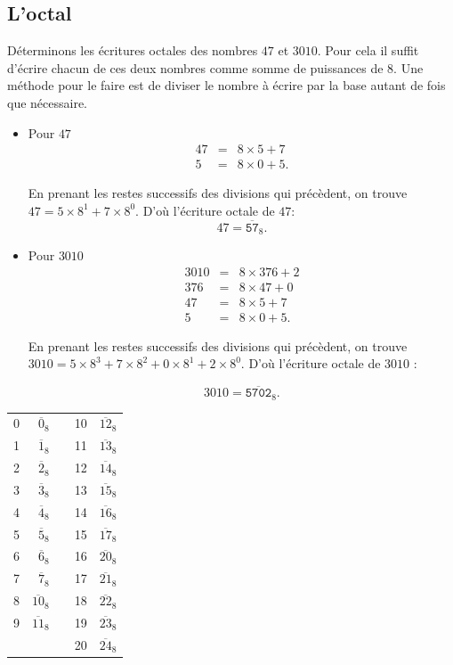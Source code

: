 \documentclass[class=report,crop=false]{standalone}
\begin{document}
\subsection{L'octal}

Déterminons les écritures octales des nombres $47$ et $3010$. Pour cela il
suffit d'écrire chacun de ces deux nombres comme somme de puissances de
8. Une méthode pour le faire est de diviser le nombre à écrire par la
base autant de fois que nécessaire.

\begin{itemize}
\item Pour $47$
  \[\begin{array}{rcl}
  47 &=& 8\times 5 + 7\\
  5  &=& 8\times 0 + 5.
  \end{array}\]

  En prenant les restes successifs des divisions qui précèdent, on
  trouve $47 = 5\times 8^1 + 7\times 8^0$. D'où l'écriture octale de $47$:
  \[47 = \overline{\mathtt{57}}_8.\]
\item Pour $3010$
  \[\begin{array}{rcl}
  3010 &=& 8\times 376 + 2\\
  376  &=& 8\times 47 + 0\\
  47   &=& 8\times 5 + 7\\
  5    &=& 8\times 0 + 5.
  \end{array}\]

  En prenant les restes successifs des divisions qui précèdent, on
  trouve $3010 = 5\times 8^3 + 7\times 8^2 + 0\times 8^1 + 2\times 8^0$.
  D'où l'écriture octale de $3010$ :

  \[3010 = \overline{\mathtt{5702}}_8.\]
\end{itemize}

 \bigskip
 

 
  
  \begin{center}
    \begin{tabular}[ht]{rrp{2cm}rr}
      0 & $\overline{0}_{8}$ & &10 & $\overline{12}_{8}$\\
      1 & $\overline{1}_{8}$ & &11 & $\overline{13}_{8}$\\
      2 & $\overline{2}_{8}$ & &12 & $\overline{14}_{8}$\\
      3 & $\overline{3}_{8}$ & &13 & $\overline{15}_{8}$\\
      4 & $\overline{4}_{8}$ & &14 & $\overline{16}_{8}$\\
      5 & $\overline{5}_{8}$ & &15 & $\overline{17}_{8}$\\
      6 & $\overline{6}_{8}$ & &16 & $\overline{20}_{8}$\\
      7 & $\overline{7}_{8}$ & &17 & $\overline{21}_{8}$\\
      8 & $\overline{10}_{8}$ & &18 & $\overline{22}_{8}$\\
      9 & $\overline{11}_{8}$ & &19 & $\overline{23}_{8}$\\
      &  & &20 & $\overline{24}_{8}$\\
    \end{tabular}
  \end{center}
\end{document}
